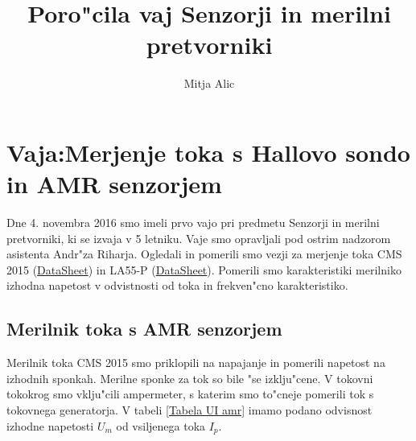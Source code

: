 \documentclass[10pt,a4paper]{article}
\author{Mitja Alic}
\title{Poro"cila vaj Senzorji in merilni pretvorniki}
\begin{document}
	\section{Vaja:Merjenje toka s Hallovo sondo in AMR senzorjem}
	
	Dne 4. novembra 2016 smo imeli prvo vajo pri predmetu Senzorji in merilni pretvorniki, ki se izvaja v 5 letniku. Vaje smo opravljali pod ostrim nadzorom asistenta Andr"za Riharja. Ogledali in pomerili smo vezji za merjenje toka CMS 2015 (\href{http://sensitec.com/upload/SENSITEC/PDF_Downloads/Datenblatt/SENSITEC_CMS2015_DSE_04.pdf}{DataSheet}) in LA55-P (\href{http://www.farnell.com/datasheets/1639877.pdf}{DataSheet}). Pomerili smo karakteristiki merilniko izhodna napetost v odvistnosti od toka in frekven"cno karakteristiko.
	\subsection{Merilnik toka s AMR senzorjem}
	
	Merilnik toka CMS 2015 smo priklopili na napajanje in pomerili napetost na izhodnih sponkah. Merilne sponke za tok so bile "se izklju"cene. V tokovni tokokrog smo vklju"cili ampermeter, s katerim smo to"cneje pomerili tok s tokovnega generatorja. V tabeli \ref{Tabela UI amr} imamo podano odvisnost izhodne napetosti $U_m$ od vsiljenega toka $I_p$.
\end{document}
